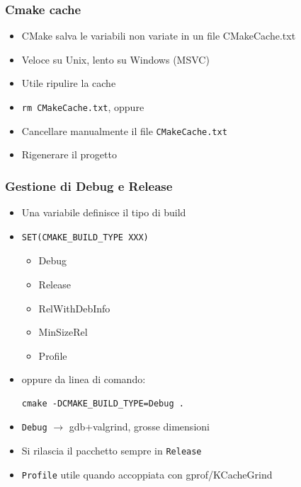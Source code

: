 \documentclass[10pt] {beamer}
\begin{document}
\begin{frame}
\frametitle{Cmake cache}
\begin{itemize}
\item CMake salva le variabili non variate in un file CMakeCache.txt
\item Veloce su Unix, lento su Windows (MSVC)
\item Utile ripulire la cache
\end{itemize}

\begin{itemize}
\item \texttt{rm CMakeCache.txt}, oppure
\item Cancellare manualmente il file \texttt{CMakeCache.txt}
\item Rigenerare il progetto
\end{itemize}

\end{frame}

\begin{frame}[fragile]
\frametitle{Gestione di Debug e Release}
\begin{itemize}
\item Una variabile definisce il tipo di build
\item
\begin{verbatim}
SET(CMAKE_BUILD_TYPE XXX)
\end{verbatim}
    \begin{itemize}
    \item Debug
    \item Release
    \item RelWithDebInfo
    \item MinSizeRel
    \item Profile
    \end{itemize}
\item oppure da linea di comando:
\begin{verbatim}
cmake -DCMAKE_BUILD_TYPE=Debug .
\end{verbatim}

\item \texttt{Debug} $\rightarrow$ gdb+valgrind, grosse dimensioni
\item Si rilascia il pacchetto sempre in \texttt{Release}
\item \texttt{Profile} utile quando accoppiata con gprof/KCacheGrind
\end{itemize}
\end{frame}
\end{document}
